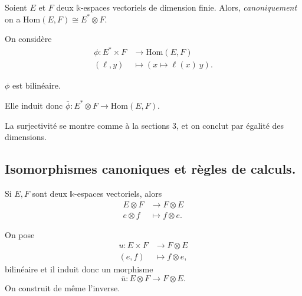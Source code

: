 \documentclass{../../notes}
\begin{document}
  \begin{prop}
    Soient $E$ et $F$ deux $\mathds{k}$-espaces vectoriels de dimension finie.
    Alors, \textit{canoniquement} on a $\mathrm{Hom}(E, F) \cong E^* \otimes F$.
  \end{prop}
  \begin{prv}
    On considère 
    \begin{align*}
      \phi: E^* \times F &\longrightarrow \mathrm{Hom}(E, F) \\
      (\ell,y) &\longmapsto (x \mapsto \ell(x)\:y)
    .\end{align*}
    \begin{obs}
      $\phi$ est bilinéaire.
    \end{obs}
    Elle induit donc $\bar{\phi} : E^* \otimes F \to \mathrm{Hom}(E, F)$.

    La surjectivité se montre comme à la sections 3, et on conclut par égalité des dimensions.
  \end{prv}

  \subsection{Isomorphismes canoniques et règles de calculs.}
  \begin{prop}
    Si $E,F$ sont deux $\mathds{k}$-espaces vectoriels, alors 
    \begin{align*}
      E \otimes F &\longrightarrow F \otimes E \\
      e \otimes f &\longmapsto f\otimes e
    .\end{align*}
  \end{prop}
  \begin{prv}
    On pose 
    \begin{align*}
      u : E \times F &\longrightarrow F \otimes E \\
      (e,f) &\longmapsto f\otimes e
    ,\end{align*}
    bilinéaire et il induit donc un morphisme \[
    \bar{u} : E \otimes F \to F \otimes E
    .\]
    On construit de même l'inverse.
  \end{prv}
\end{document}
